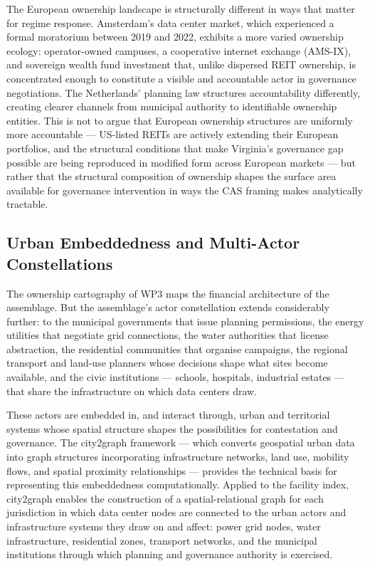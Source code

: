 The European ownership landscape is structurally different in ways that matter for regime response. Amsterdam's data center market, which experienced a formal moratorium between 2019 and 2022, exhibits a more varied ownership ecology: operator-owned campuses, a cooperative internet exchange (AMS-IX), and sovereign wealth fund investment that, unlike dispersed REIT ownership, is concentrated enough to constitute a visible and accountable actor in governance negotiations. The Netherlands' planning law structures accountability differently, creating clearer channels from municipal authority to identifiable ownership entities. This is not to argue that European ownership structures are uniformly more accountable — US-listed REITs are actively extending their European portfolios, and the structural conditions that make Virginia's governance gap possible are being reproduced in modified form across European markets — but rather that the structural composition of ownership shapes the surface area available for governance intervention in ways the CAS framing makes analytically tractable.

\subsection{Urban Embeddedness and Multi-Actor Constellations}

The ownership cartography of WP3 maps the financial architecture of the assemblage. But the assemblage's actor constellation extends considerably further: to the municipal governments that issue planning permissions, the energy utilities that negotiate grid connections, the water authorities that license abstraction, the residential communities that organise campaigns, the regional transport and land-use planners whose decisions shape what sites become available, and the civic institutions — schools, hospitals, industrial estates — that share the infrastructure on which data centers draw.

These actors are embedded in, and interact through, urban and territorial systems whose spatial structure shapes the possibilities for contestation and governance. The city2graph framework \citep{city2graph} — which converts geospatial urban data into graph structures incorporating infrastructure networks, land use, mobility flows, and spatial proximity relationships — provides the technical basis for representing this embeddedness computationally. Applied to the facility index, city2graph enables the construction of a spatial-relational graph for each jurisdiction in which data center nodes are connected to the urban actors and infrastructure systems they draw on and affect: power grid nodes, water infrastructure, residential zones, transport networks, and the municipal institutions through which planning and governance authority is exercised.

